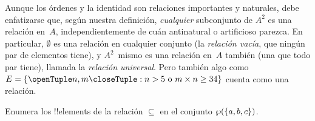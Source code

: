 \documentclass[../../../include/open-logic-section]{subfiles}
\begin{document}
\begin{explain}
Aunque los órdenes y la identidad son relaciones importantes y naturales, debe enfatizarse que, según nuestra definición, \emph{cualquier} subconjunto de $A^{2}$ es una relación en~$A$, independientemente de cuán antinatural o artificioso parezca. En particular, $\emptyset$ es una relación en cualquier conjunto (la \emph{relación vacía}, que ningún par de elementos tiene), y $A^{2}$~mismo es una relación en~$A$ también (una que todo par tiene), llamada la \emph{relación universal}. Pero también algo como $E=\Setabs{\tuple{n, m}}{n>5 \text{ o } m \times n \ge 34}$ cuenta como una relación.
\end{explain}

\begin{prob}
Enumera los !!{element}s de la relación $\subseteq$ en el conjunto $\wp(\{a, b, c\})$.
\end{prob}
\end{document}
